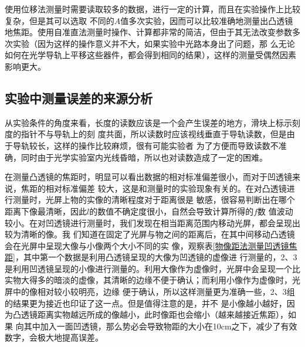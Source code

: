 \documentclass[a4paper]{ctexart}
\begin{document}
			\par
			使用位移法测量时需要读取较多的数据，进行一定的计算，而且在实验操作上比较复杂，但是其可以选取
			不同的$A$值多次实验，因而可以比较准确地测量出凸透镜地焦距。使用自准直法测量时操作、计算都非常的简洁，但由于其无法改变参数多次实验（因为这样的操作意义并不大，如果实验中光路本身出了问题，那
			么无论如何在光学导轨上平移这些器件，都会得到相同的结果），这样的测量受偶然因素影响更大。
		\subsection{实验中测量误差的来源分析}
			\par 
			从实验条件的角度来看，长度的读数应该是一个会产生误差的地方，滑块上标示刻度的指针不与导轨上的刻
			度共面，所以读数时应该视线垂直于导轨读数，但是由于导轨较长，这样的操作比较麻烦，很有可能实验者
			为了方便而导致读数不准确，同时由于光学实验室内光线昏暗，所以也对读数造成了一定的困难。
			\par 
			在测量凸透镜的焦距时，明显可以看出数据的相对标准偏差很小，而对于凹透镜来说，焦距的相对标准偏差
			较大，这是和测量时的实验现象有关的。在对凸透镜进行测量时，光屏上物的实像的清晰程度对于距离很是
			敏感，很容易判断出在哪个距离下像最清晰，因此$l$的数值不确定度很小，自然会导致计算所得的$f$数
			值波动较小。在对凹透镜进行测量时，我们发现在相当距离范围内移动光屏，都会呈现出较为清晰的像。我
			们知道在固定了光屏与物之间的距离后，在其中间移动凸透镜会在光屏中呈现大像与小像两个大小不同的实
			像，观察表\ref{物像距法测量凹透镜焦距}，其中第一个数据是利用凸透镜呈现的大像为凹透镜的虚像进
			行测量的，2、3是利用凹透镜呈现的小像进行测量的。利用大像作为虚像时，光屏中会呈现一个比实物大得多的暗淡的虚像，其清晰的边缘不便于确认；而利用小像作为虚像时，光屏中的像相对较小较明亮，边缘
			便于确认，所以这样测量更为准确一些，2、3组的结果更为接近也印证了这一点。但是值得注意的是，并不
			是小像越小越好，因为凸透镜距离实物越远所成的像越小，此时像距也会缩小（越来越接近焦距），如果
			向其中加入一面凹透镜，那么势必会导致物距的大小在10cm之下，减少了有效数字，会极大地提高误差。
\end{document}
